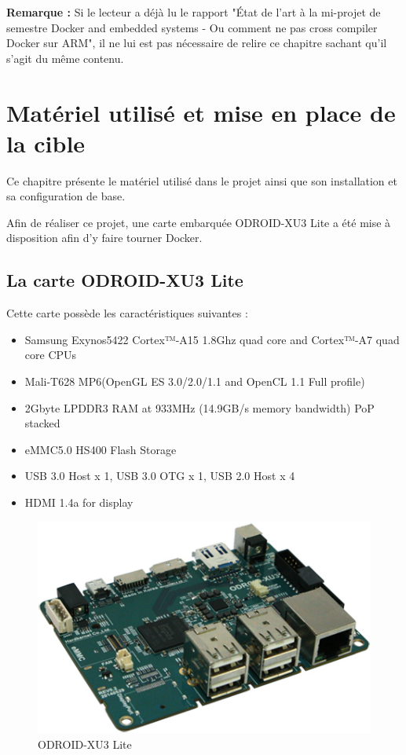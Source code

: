 \documentclass[11pt,a4paper,oneside]{report}
\newcommand{\oldreportname}{État de l’art à la mi-projet de semestre Docker and embedded systems - Ou comment ne pas cross compiler Docker sur ARM}
\newcommand{\odroid}{ODROID-XU3 Lite }
\begin{document}
\textbf{Remarque : } Si le lecteur a déjà lu le rapport "\oldreportname", il ne lui est pas nécessaire de relire ce chapitre sachant qu'il s'agit du même contenu.



\chapter{Matériel utilisé et mise en place de la cible}

Ce chapitre présente le matériel utilisé dans le projet ainsi que son installation et sa configuration de base.

Afin de réaliser ce projet, une carte embarquée \odroid a été mise à disposition afin d'y faire tourner Docker. 

\section{La carte \odroid}

Cette carte possède les caractéristiques suivantes \cite{hardkernel_odroid_xu3}: 

\begin{itemize}
\item Samsung Exynos5422 Cortex™-A15 1.8Ghz quad core and Cortex™-A7 quad core CPUs 
\item Mali-T628 MP6(OpenGL ES 3.0/2.0/1.1 and OpenCL 1.1 Full profile)
\item 2Gbyte LPDDR3 RAM at 933MHz (14.9GB/s memory bandwidth) PoP stacked
\item eMMC5.0 HS400 Flash Storage
\item USB 3.0 Host x 1, USB 3.0 OTG x 1, USB 2.0 Host x 4
\item HDMI 1.4a for display
\end{itemize}

\begin{figure}[hbtp]
\centering
\includegraphics[scale=0.5]{img/ODROIDXU3Lite.jpg}
\caption{\odroid}
\end{figure}
\end{document}
